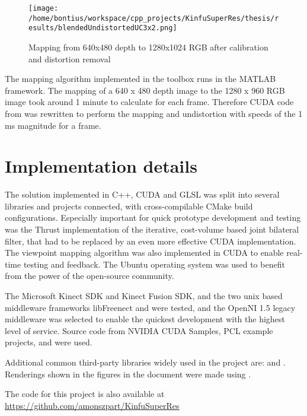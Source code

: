 \documentclass{ucl_thesis}
\begin{document}
\begin{figure}[h!]\centering
        \texttt{[image: /home/bontius/workspace/cpp\_projects/KinfuSuperRes/thesis/results/blendedUndistortedUC3x2.png]}
        \caption{Mapping from 640x480 depth to 1280x1024 RGB after calibration and distortion removal}
        \label{fig:final_calib}
\end{figure}

\par The mapping algorithm implemented in the toolbox runs in the MATLAB framework. The mapping of a 640 x 480 depth image to the 1280 x 960 RGB image took around 1 minute to calculate for each frame. Therefore CUDA code from \citep{kinect_lua} was rewritten to perform the mapping and undistortion with speeds of the 1 ms magnitude for a frame.

\section{Implementation details}
\label{sec:implementation_details}

\par The solution implemented in C++, CUDA and GLSL was split into several libraries and projects connected, with cross-compilable CMake build configurations. Especially important for quick prototype development and testing was the Thrust implementation of the iterative, cost-volume based joint bilateral filter, that had to be replaced by an even more effective CUDA implementation. The viewpoint mapping algorithm was also implemented in CUDA to enable real-time testing and feedback. The Ubuntu operating system was used to benefit from the power of the open-source community.

\par The Microsoft Kinect SDK and Kinect Fusion SDK, and the two unix based middleware frameworks libFreenect and \citep{openni} were tested, and the OpenNI 1.5 legacy middleware was selected to enable the quickest development with the highest level of service. Source code from NVIDIA CUDA Samples, PCL example projects, \citep{DCBGridStereo} and \citep{kinect_lua} were used.

\par Additional common third-party libraries widely used in the project are: \citep{opencv} and \citep{libeigen}. Renderings shown in the figures in the document were made using \citep{Meshlab}. 

\par The code for this project is also available at \url{https://github.com/amonszpart/KinfuSuperRes}
\end{document}
